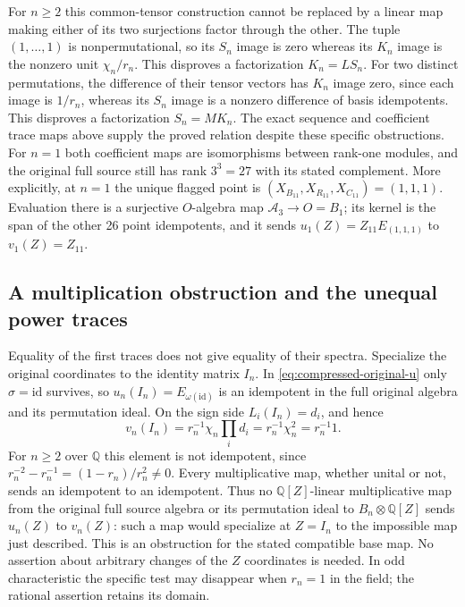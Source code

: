For $n\ge2$ this common-tensor construction cannot be replaced by
a linear map making either of its two surjections factor through
the other. The tuple $(1,\ldots,1)$ is nonpermutational, so its
$S_n$ image is zero whereas its $K_n$ image is the nonzero unit
$\chi_n/r_n$. This disproves a factorization $K_n=L S_n$.
For two distinct permutations, the difference of their tensor
vectors has $K_n$ image zero, since each image is $1/r_n$,
whereas its $S_n$ image is a nonzero difference of basis idempotents.
This disproves a factorization $S_n=M K_n$. The exact sequence
and coefficient trace maps above supply the proved relation despite
these specific obstructions. For $n=1$ both coefficient maps are
isomorphisms between rank-one modules, and the original full source
still has rank $3^3=27$ with its stated complement.
More explicitly, at $n=1$ the unique flagged point is
$(X_{B_{11}},X_{R_{11}},X_{C_{11}})=(1,1,1)$. Evaluation there
is a surjective $O$-algebra map $\mathcal A_3\to O=B_1$;
its kernel is the span of the other 26 point idempotents, and
it sends $u_1(Z)=Z_{11}E_{(1,1,1)}$ to $v_1(Z)=Z_{11}$.

\subsection{A multiplication obstruction and the unequal power traces}

Equality of the first traces does not give equality of their spectra.
Specialize the original coordinates to the identity matrix $I_n$.
In \eqref{eq:compressed-original-u} only $\sigma=\mathrm{id}$
survives, so $u_n(I_n)=E_{\omega(\mathrm{id})}$ is an idempotent
in the full original algebra and its permutation ideal. On the sign
side $L_i(I_n)=d_i$, and hence
\[
 v_n(I_n)=r_n^{-1}\chi_n\prod_i d_i=r_n^{-1}\chi_n^2=r_n^{-1}1.
\]
For $n\ge2$ over $\mathbb Q$ this element is not idempotent,
since $r_n^{-2}-r_n^{-1}=(1-r_n)/r_n^2\ne0$.
Every multiplicative map, whether unital or not, sends an idempotent
to an idempotent. Thus no $\mathbb Q[Z]$-linear multiplicative map
from the original full source algebra or its permutation ideal
to $B_n\otimes\mathbb Q[Z]$ sends $u_n(Z)$ to $v_n(Z)$:
such a map would specialize at $Z=I_n$ to the impossible map just
described. This is an obstruction for the stated compatible base
map. No assertion about arbitrary changes of the $Z$ coordinates
is needed. In odd characteristic the specific test may disappear
when $r_n=1$ in the field; the rational assertion retains its domain.

